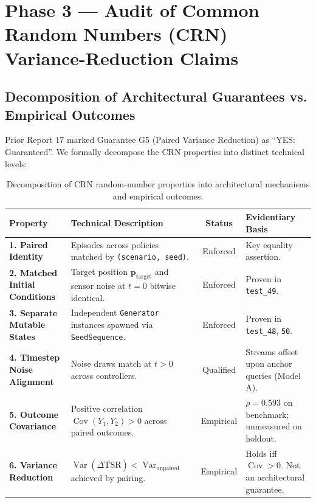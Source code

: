 \documentclass[10pt,a4paper]{article}
\begin{document}
\section{Phase 3 — Audit of Common Random Numbers (CRN) Variance-Reduction Claims}

\subsection{Decomposition of Architectural Guarantees vs. Empirical Outcomes}
Prior Report 17 marked Guarantee G5 (Paired Variance Reduction) as ``YES: Guaranteed''. We formally decompose the CRN properties into distinct technical levels:

\begin{table}[h!]
\centering
\small
\begin{tabularx}{\textwidth}{l X c p{3.2cm}}
\toprule
\textbf{Property} & \textbf{Technical Description} & \textbf{Status} & \textbf{Evidentiary Basis} \\
\midrule
\textbf{1. Paired Identity} & Episodes across policies matched by \texttt{(scenario, seed)}. & Enforced & Key equality assertion. \\
\textbf{2. Matched Initial Conditions} & Target position $\mathbf{p}_{\mathrm{target}}$ and sensor noise at $t=0$ bitwise identical. & Enforced & Proven in \texttt{test\_49}. \\
\textbf{3. Separate Mutable States} & Independent \texttt{Generator} instances spawned via \texttt{SeedSequence}. & Enforced & Proven in \texttt{test\_48}, \texttt{50}. \\
\textbf{4. Timestep Noise Alignment} & Noise draws match at $t > 0$ across controllers. & Qualified & Streams offset upon anchor queries (Model A). \\
\textbf{5. Outcome Covariance} & Positive correlation $\operatorname{Cov}(Y_1, Y_2) > 0$ across paired outcomes. & Empirical & $\rho = 0.593$ on benchmark; unmeasured on holdout. \\
\textbf{6. Variance Reduction} & $\operatorname{Var}(\overline{\Delta\mathrm{TSR}}) < \operatorname{Var}_{\text{unpaired}}$ achieved by pairing. & Empirical & Holds iff $\operatorname{Cov} > 0$. Not an architectural guarantee. \\
\bottomrule
\end{tabularx}
\caption{Decomposition of CRN random-number properties into architectural mechanisms and empirical outcomes.}
\end{table}
\end{document}
